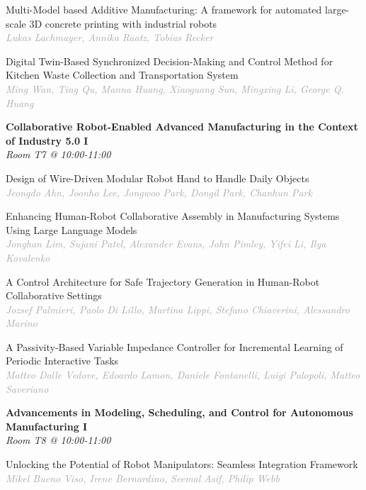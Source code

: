 \begin{multicols*}{2}
\small Multi-Model based Additive Manufacturing: A framework for automated large-scale 3D concrete printing with industrial robots\\ 
\footnotesize \textcolor{darkgray}{\textit{Lukas Lachmayer, Annika  Raatz, Tobias  Recker}}

\small Digital Twin-Based Synchronized Decision-Making and Control Method for Kitchen Waste Collection and Transportation System\\ 
\footnotesize \textcolor{darkgray}{\textit{Ming Wan, Ting  Qu, Manna  Huang, Xiaoguang  Sun, Mingxing  Li, George Q.  Huang}}

\normalsize \textbf{Collaborative Robot-Enabled Advanced Manufacturing in the Context of Industry 5.0 I}\\
\small \textit{Room T7 @ 10:00-11:00}

\small Design of Wire-Driven Modular Robot Hand to Handle Daily Objects\\ 
\footnotesize \textcolor{darkgray}{\textit{Jeongdo Ahn, Joonho  Lee, Jongwoo  Park, Dongil  Park, Chanhun  Park}}

\small Enhancing Human-Robot Collaborative Assembly in Manufacturing Systems Using Large Language Models\\ 
\footnotesize \textcolor{darkgray}{\textit{Jonghan Lim, Sujani  Patel, Alexander  Evans, John  Pimley, Yifei  Li, Ilya  Kovalenko}}

\small A Control Architecture for Safe Trajectory Generation in Human-Robot Collaborative Settings\\ 
\footnotesize \textcolor{darkgray}{\textit{Jozsef Palmieri, Paolo  Di Lillo, Martina  Lippi, Stefano  Chiaverini, Alessandro  Marino}}

\small A Passivity-Based Variable Impedance Controller for Incremental Learning of Periodic Interactive Tasks\\ 
\footnotesize \textcolor{darkgray}{\textit{Matteo Dalle Vedove, Edoardo  Lamon, Daniele  Fontanelli, Luigi  Palopoli, Matteo  Saveriano}}

\normalsize \textbf{Advancements in Modeling, Scheduling, and Control for Autonomous Manufacturing I}\\
\small \textit{Room T8 @ 10:00-11:00}

\small Unlocking the Potential of Robot Manipulators: Seamless Integration Framework\\ 
\footnotesize \textcolor{darkgray}{\textit{Mikel Bueno Viso, Irene  Bernardino, Seemal  Asif, Philip  Webb}}


\end{multicols*}
